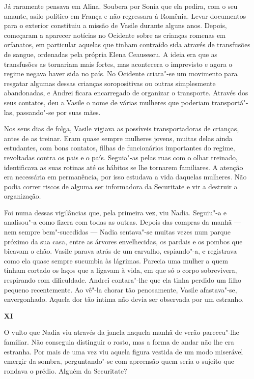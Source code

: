 Já raramente pensava em Alina. Soubera por Sonia que ela pedira, com o
seu amante, asilo político em França e não regressara à Romênia. Levar
documentos para o exterior constituiu a missão de Vasile durante alguns
anos. Depois, começaram a aparecer notícias no Ocidente sobre as
crianças romenas em orfanatos, em particular aquelas
que tinham contraído sida através de transfusões de sangue, ordenadas
pela própria Elena Ceausescu. A ideia era que as transfusões as
tornariam mais fortes, mas acontecera o imprevisto e agora o regime
negava haver sida no país. No Ocidente criara"-se um movimento para
resgatar algumas dessas crianças soropositivas ou outras simplesmente
abandonadas, e Andrei ficara encarregado de organizar o transporte.
Através dos seus contatos, deu a Vasile o nome de várias mulheres que
poderiam transportá"-las, passando"-se por suas mães.

Nos seus dias de folga, Vasile vigiava as possíveis transportadoras de
crianças, antes de as treinar. Eram quase sempre mulheres jovens, muitas
delas ainda estudantes, com bons contatos, filhas de funcionários importantes do regime, revoltadas contra os pais e o país. Seguia"-as pelas
ruas com o olhar treinado, identificava as suas rotinas até os hábitos
se lhe tornarem familiares. A atenção era necessária em permanência, por
isso estudava a vida daquelas mulheres. Não podia correr riscos de
alguma ser informadora da Securitate e vir a destruir a organização.

Foi numa dessas vigilâncias que, pela primeira vez, viu Nadia. Seguiu"-a
e analisou"-a como fizera com todas as outras. Depois das compras da
manhã --- nem sempre bem"-sucedidas --- Nadia sentava"-se muitas vezes num parque próximo da sua
casa, entre as árvores envelhecidas, os pardais e os pombos que bicavam
o chão. Vasile parava atrás de um carvalho, espiando"-a, e registrava como
ela quase sempre sucumbia às lágrimas. Parecia uma mulher a quem tinham
cortado os laços que a ligavam à vida,
em que só o corpo sobrevivera, respirando com dificuldade. Andrei
contara"-lhe que ela tinha perdido um filho pequeno recentemente. Ao
vê"-la chorar tão penosamente, Vasile afastava"-se, envergonhado. Aquela
dor tão íntima não devia ser observada por um estranho.


\pagebreak
\thispagestyle{empty}
\movetooddpage
\vspace*{1.8cm}
\noindent{}\textbf{XI}

\bigskip

\noindent{}O vulto que Nadia viu através da janela naquela manhã de verão
pareceu"-lhe familiar. Não conseguia distinguir o rosto, mas a forma de
andar não lhe era estranha. Por mais de uma vez viu aquela figura
vestida de um modo miserável emergir da sombra, perguntando"-se com
apreensão quem seria o sujeito que rondava o prédio. Alguém da
Securitate?

